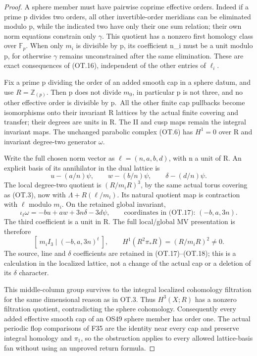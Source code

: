 \begin{proof}
A sphere member must have pairwise coprime effective orders. Indeed if a
prime p divides two orders, all other invertible-order meridians can be
eliminated modulo p, while the indicated two have only their one sum
relation; their own norm equations constrain only \(\gamma\). This quotient
has a nonzero first homology class over \(\mathbb F_p\). When only \(m_i\) is divisible
by p, its coefficient n\_i must be a unit modulo p, for otherwise \(\gamma\)
remains unconstrained after the same elimination. These are exact
consequences of (OT.16), independent of the other entries of \(\ell_i\).

Fix a prime p dividing the order of an added smooth cap in a sphere datum,
and use \(R=\mathbb Z_{(p)}\). Then p does not divide \(m_0\), in particular p is not three,
and no other effective order is divisible by p.~All the other finite
cap pullbacks become isomorphisms onto their invariant R lattices by
the actual finite covering and transfer; their degrees are units in R.
The II and cusp maps remain the integral invariant maps. The unchanged
parabolic complex (OT.6) has \(H^1=0\) over R and invariant degree-two
generator \(\omega\).

Write the full chosen norm vector as \(\ell=(n,a,b,d)\), with n a unit of R.
An explicit basis of its annihilator in the dual lattice is
\[
 u-(a/n)\psi,\qquad w-(b/n)\psi,
                         \qquad\delta-(d/n)\psi.          \tag{OT.17}
\]
The local degree-two quotient is \((R/m_iR)^3\), by the same actual torus
covering as (OT.3), now with \(\Lambda+R(\ell/m_i)\). Its natural quotient map
is contraction with \(\ell\) modulo \(m_i\). On the retained global invariant,
\[
 \iota_\ell\omega=-b u+a w+3n\delta-3d\psi,
 \qquad\text{coordinates in (OT.17): }(-b,a,3n).           \tag{OT.18}
\]
The third coefficient is a unit in R. The full local/global MV
presentation is therefore
\[
            [\ m_i I_3\mid(-b,a,3n)^t\ ],
 \qquad H^1(R^2\pi_*R)=(R/m_iR)^2\ne0.                 \tag{OT.19}
\]
The source, line and \(\delta\) coefficients are retained in (OT.17)--(OT.18);
this is a calculation in the localized lattice, not a change of the
actual cap or a deletion of its \(\delta\) character.

This middle-column group survives to the integral localized cohomology
filtration for the same dimensional reason as in OT.3. Thus \(H^3(X;R)\)
has a nonzero filtration quotient, contradicting the sphere cohomology.
Consequently every added effective smooth cap of an OS49 sphere member
has order one. The actual periodic flop comparisons of F35 are the
identity near every cap and preserve integral homology and \(\pi_1\), so the
obstruction applies to every allowed lattice-basis fan without using an
unproved return formula.


\end{proof}
